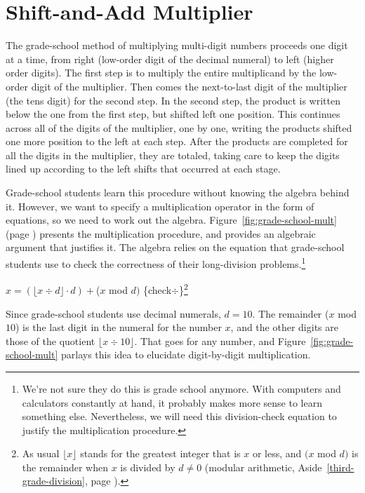 \section{Shift-and-Add Multiplier}
\label{sec:bignum-mult}

The grade-school method of multiplying multi-digit numbers proceeds one digit at a time,
from right (low-order digit of the decimal numeral) to left (higher order digits).
The first step is to multiply the entire multiplicand by the low-order digit
of the multiplier.
Then comes the next-to-last digit of the multiplier (the tens digit) for the second step.
In the second step, the product is written below the one from the first step,
but shifted left one position.
This continues across all of the digits of the multiplier, one by one,
writing the products shifted one more position to the left at each step.
After the products are completed for
all the digits in the multiplier, they are totaled, taking care to keep
the digits lined up according to the left shifts that occurred at each stage.

Grade-school students learn this procedure
without knowing the algebra behind it.
However, we want to specify a
multiplication operator in the form of equations, 
so we need to work out the algebra.
Figure~\ref{fig:grade-school-mult} (page \pageref{fig:grade-school-mult})
presents the multiplication procedure,
and provides an algebraic argument that justifies it.
The algebra relies on the equation
that grade-school students use to check the correctness of their long-division 
problems.\footnote{We're not
sure they do this is grade school anymore.
With computers and calculators constantly at hand,
it probably makes more sense to learn something else. 
Nevertheless, we will need this
division-check equation to justify the multiplication procedure.}

\hspace{2mm} $x = (\lfloor x \div d \rfloor \cdot d) + $($x$ mod $d)$ \hfill \{check$\div$\}\footnote{As
usual $\lfloor x\rfloor$ stands for the greatest integer that is $x$ or less,
and $(x$ mod $d)$ is the remainder when $x$ is divided by $d \neq 0$ (modular arithmetic,
Aside~\ref{third-grade-division}, page \pageref{third-grade-division}).}
\vspace{2mm}

Since grade-school students use decimal numerals,  $d = 10$.
The remainder ($x$ mod $10$) is the last digit in the numeral for the number $x$,
and the other digits are those of the quotient $\lfloor x \div 10 \rfloor$.
That goes for any number, and
Figure~\ref{fig:grade-school-mult}
parlays this idea to elucidate digit-by-digit multiplication.

